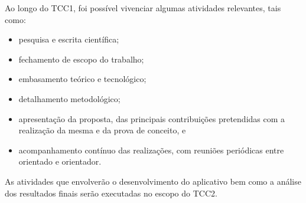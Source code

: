 Ao longo do TCC1, foi possível vivenciar algumas atividades relevantes, tais como:

\begin{itemize}
    \item pesquisa e escrita científica;
    \item fechamento de escopo do trabalho;
    \item embasamento teórico e tecnológico;
    \item detalhamento metodológico;
    \item apresentação da proposta, das principais contribuições pretendidas com a realização da mesma e da prova de conceito, e
    \item acompanhamento contínuo das realizações, com reuniões periódicas entre orientado e orientador.
\end{itemize}

As atividades que envolverão o desenvolvimento do aplicativo bem como a análise dos resultados finais serão executadas no escopo do TCC2.